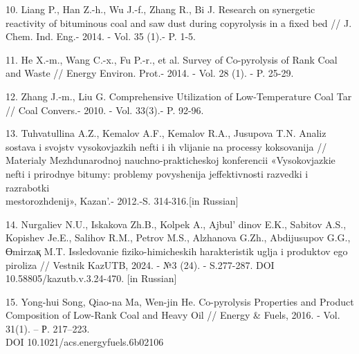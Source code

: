 \begin{references}
10. Liang P., Han Z.-h., Wu J.-f., Zhang R., Bi J. Research on
synergetic reactivity of bituminous coal and saw dust during copyrolysis
in a fixed bed // J. Chem. Ind. Eng.- 2014. - Vol. 35 (1).- P. 1-5.

11. He X.-m., Wang C.-x., Fu P.-r., et al. Survey of Co-pyrolysis of
Rank Coal and Waste // Energy Environ. Prot.- 2014. - Vol. 28 (1). - P.
25-29.

12. Zhang J.-m., Liu G. Comprehensive Utilization of Low-Temperature
Coal Tar // Coal Convers.- 2010. - Vol. 33(3).- P. 92-96.

13. Tuhvatullina A.Z., Kemalov A.F., Kemalov R.A., Jusupova T.N. Analiz
sostava i svojstv vysokovjazkih nefti i ih vlijanie na processy
koksovanija // Materialy Mezhdunarodnoj nauchno-prakticheskoj
konferencii «Vysokovjazkie nefti i prirodnye bitumy: problemy
povyshenija jeffektivnosti razvedki i razrabotki\\ mestorozhdenij»,
Kazan'.- 2012.-S. 314-316.{[}in Russian{]}

14. Nurgaliev N.U., Iskakova Zh.B., Kolpek A.,
Ajbul' dinov E.K., Sabitov A.S., Kopishev Je.E., Salihov
R.M., Petrov M.S., Alzhanova G.Zh., Abdijusupov G.G., Өmіrzaқ M.T.
Issledovanie fiziko-himicheskih harakteristik uglja i produktov ego
piroliza // Vestnik KazUTB, 2024. - №3 (24). - S.277-287. DOI
\\10.58805/kazutb.v.3.24-470. {[}in Russian{]}

15. Yong-hui Song, Qiao-na Ma, Wen-jin He. Co-pyrolysis Properties and
Product Composition of Low-Rank Coal and Heavy Oil // Energy \& Fuels,
2016. - Vol. 31(1). -- Р. 217--223. \\DOI 10.1021/acs.energyfuels.6b02106
\end{references}

